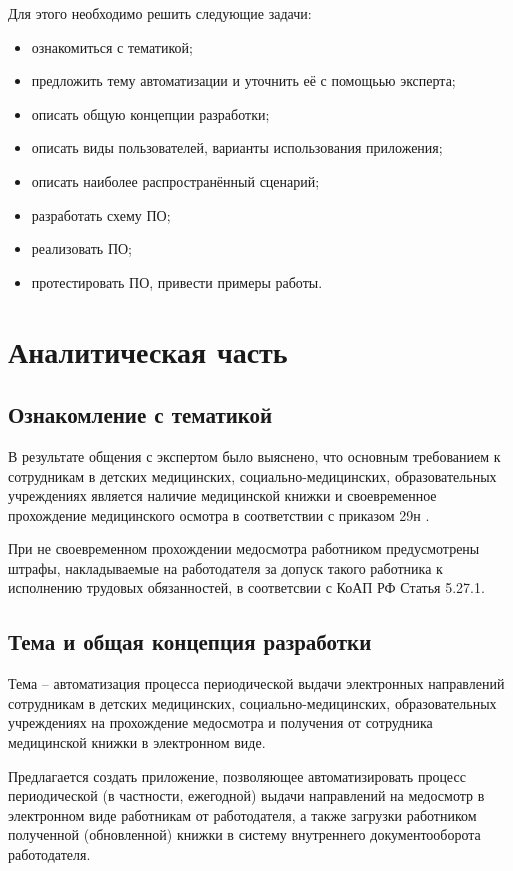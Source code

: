 \documentclass[12pt]{report}
\begin{document}
Для этого необходимо решить следующие задачи:
\begin{itemize}
    \item ознакомиться с тематикой;
    \item предложить тему автоматизации и уточнить её с помощьью эксперта;
    \item описать общую концепции разработки;
    \item описать виды пользователей, варианты использования приложения;
    \item описать наиболее распространённый сценарий;
    \item разработать схему ПО;
    \item реализовать ПО;
    \item протестировать ПО, привести примеры работы.
\end{itemize}

\chapter{Аналитическая часть}

\section{Ознакомление с тематикой}
В результате общения с экспертом было выяснено, что основным требованием к сотрудникам в детских медицинских, социально-медицинских, образовательных учреждениях является наличие медицинской книжки и своевременное прохождение медицинского осмотра в соответствии с приказом 29н \cite{29n}.

При не своевременном прохождении медосмотра работником предусмотрены штрафы, накладываемые на работодателя за допуск такого работника к исполнению трудовых обязанностей, в соответсвии с КоАП РФ Статья 5.27.1.

\section{Тема и общая концепция разработки} 

Тема -- автоматизация процесса периодической выдачи электронных направлений сотрудникам в детских медицинских, социально-медицинских, образовательных учреждениях на прохождение медосмотра и получения от сотрудника медицинской книжки в электронном виде.

Предлагается создать приложение, позволяющее автоматизировать процесс периодической (в частности, ежегодной) выдачи направлений на медосмотр в электронном виде работникам от работодателя, а также загрузки работником полученной (обновленной) книжки в систему внутреннего документооборота работодателя. 
\end{document}
